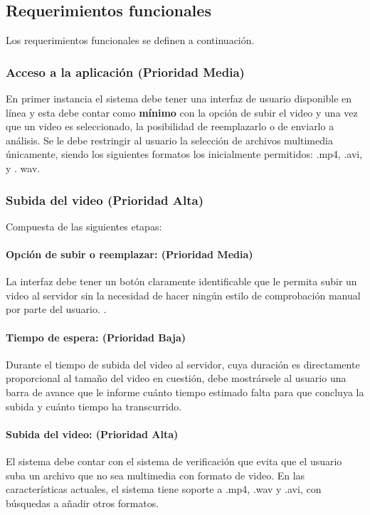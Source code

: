 \documentclass[a4paper]{article}
\newcommand\tab[1][0.55cm]{\hspace*{#1}}
\begin{document}
{\color{Blue}
\subsection{Requerimientos funcionales}
\color{black}
\justify 

	\tab Los requerimientos funcionales se definen a continuación. 
    
   	\subsubsection{Acceso a la aplicación (Prioridad Media)}
    	En primer instancia el sistema debe tener una interfaz de usuario disponible en línea y esta debe contar como \textbf{mínimo} con la opción de subir el video y una vez que un video es seleccionado, la posibilidad de reemplazarlo o de enviarlo a análisis. Se le debe restringir al usuario la selección de archivos multimedia únicamente, siendo los siguientes formatos los inicialmente permitidos: .mp4, .avi, y . wav.
        
    \subsubsection{Subida del video (Prioridad Alta)}
    	Compuesta de las siguientes etapas: \\
		
        \paragraph{Opción de subir o reemplazar: (Prioridad Media)}
     	La interfaz debe tener un botón claramente identificable que le permita subir un video al servidor sin la necesidad de hacer ningún estilo de comprobación manual por parte del usuario. . \\ 
        
        \paragraph{Tiempo de espera: (Prioridad Baja) }
        Durante el tiempo de subida del video al servidor, cuya duración es directamente proporcional al tamaño del video en cuestión, debe mostrársele al usuario una barra de avance que le informe cuánto tiempo estimado falta para que concluya la subida y cuánto tiempo ha transcurrido. \\
        
       	\paragraph{Subida del video: (Prioridad Alta) }
        El sistema debe contar con el sistema de verificación que evita que el usuario suba un archivo que no sea multimedia con formato de video. En las características actuales, el sistema tiene soporte a .mp4, .wav y .avi, con búsquedas a añadir otros formatos. \\
        
}
\end{document}
